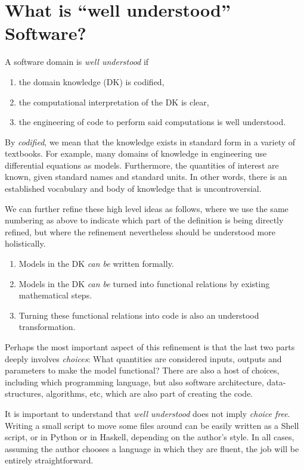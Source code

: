 \documentclass[10pt,twoside,onecolumn,openany,letterpaper]{memoir}
\begin{document}
\chapter{What is ``well understood'' Software?}\label{ch:wellUnderstood}

\begin{defn}
A software domain is \emph{well understood} if
\begin{enumerate}
\item the domain knowledge (DK) is codified,
\item the computational interpretation of the DK is clear,
\item the engineering of code to perform said computations is well
understood.
\end{enumerate}
\end{defn}

By \emph{codified}, we mean that the knowledge exists in standard form in
a variety of textbooks. For example, many domains of knowledge in engineering
use differential equations as models. Furthermore, the quantities of interest
are known, given standard names and standard units. In other words, there is
an established vocabulary and body of knowledge that is uncontroversial.

We can further refine these high level ideas as follows, where we use
the same numbering as above to indicate which part of the definition is
being directly refined, but where the refinement nevertheless should be
understood more holistically.
\begin{enumerate}
\item Models in the DK \emph{can be} written formally.
\item Models in the DK \emph{can be} turned into functional relations by
 existing mathematical steps.
\item Turning these functional relations into code is also an understood
 transformation.
\end{enumerate}
Perhaps the most important aspect of this refinement is that the last two
parts deeply involves \emph{choices}: What quantities are considered inputs,
outputs and parameters to make the model functional? There are also a host
of choices, including which programming language, but also software
architecture, data-structures, algorithms, etc, which are also part of
creating the code.

It is important to understand that \emph{well understood} does not imply
\emph{choice free}.  Writing a small script to move some files around can
be easily written as a Shell script, or in Python or in Haskell, depending on
the author's style. In all cases, assuming the author chooses a language
in which they are fluent, the job will be entirely straightforward.
\end{document}
